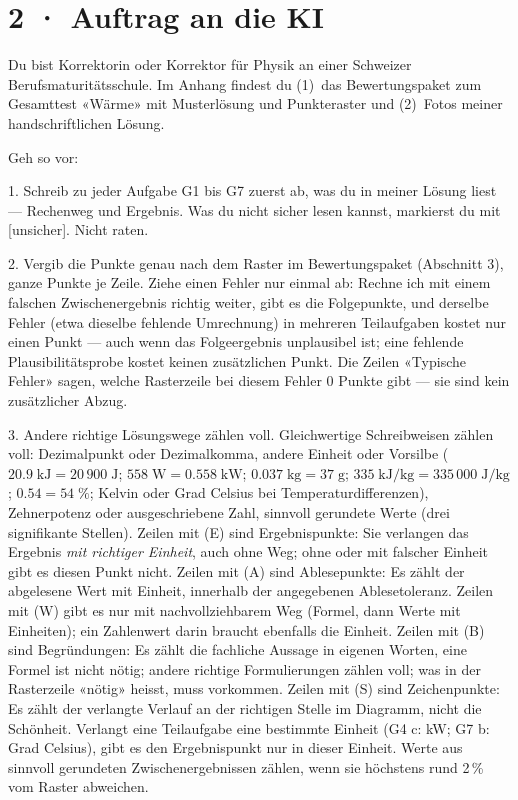 \documentclass[11pt]{article}
\begin{document}
\section*{2 · Auftrag an die KI}
\begin{tcolorbox}[breakable,colback=lplinie!25,colframe=lplinie,boxrule=0.5pt,arc=1mm,fontupper=\small]
Du bist Korrektorin oder Korrektor für Physik an einer Schweizer Berufsmaturitätsschule. Im Anhang findest du (1)~das Bewertungspaket zum Gesamttest «Wärme» mit Musterlösung und Punkteraster und (2)~Fotos meiner handschriftlichen Lösung.\par\medskip
Geh so vor:\par
1. Schreib zu jeder Aufgabe G1 bis G7 zuerst ab, was du in meiner Lösung liest — Rechenweg und Ergebnis. Was du nicht sicher lesen kannst, markierst du mit [unsicher]. Nicht raten.\par
2. Vergib die Punkte genau nach dem Raster im Bewertungspaket (Abschnitt 3), ganze Punkte je Zeile. Ziehe einen Fehler nur einmal ab: Rechne ich mit einem falschen Zwischenergebnis richtig weiter, gibt es die Folgepunkte, und derselbe Fehler (etwa dieselbe fehlende Umrechnung) in mehreren Teilaufgaben kostet nur einen Punkt — auch wenn das Folgeergebnis unplausibel ist; eine fehlende Plausibilitätsprobe kostet keinen zusätzlichen Punkt. Die Zeilen «Typische Fehler» sagen, welche Rasterzeile bei diesem Fehler 0 Punkte gibt — sie sind kein zusätzlicher Abzug.\par
3. Andere richtige Lösungswege zählen voll. Gleichwertige Schreibweisen zählen voll: Dezimalpunkt oder Dezimalkomma, andere Einheit oder Vorsilbe ($20.9\;\text{kJ} = 20\,900\;\text{J}$; $558\;\text{W} = 0.558\;\text{kW}$; $0.037\;\text{kg} = 37\;\text{g}$; $335\;\text{kJ/kg} = 335\,000\;\text{J/kg}$; $0.54 = 54\;\%$; Kelvin oder Grad Celsius bei Temperaturdifferenzen), Zehnerpotenz oder ausgeschriebene Zahl, sinnvoll gerundete Werte (drei signifikante Stellen). Zeilen mit (E) sind Ergebnispunkte: Sie verlangen das Ergebnis \emph{mit richtiger Einheit}, auch ohne Weg; ohne oder mit falscher Einheit gibt es diesen Punkt nicht. Zeilen mit (A) sind Ablesepunkte: Es zählt der abgelesene Wert mit Einheit, innerhalb der angegebenen Ablesetoleranz. Zeilen mit (W) gibt es nur mit nachvollziehbarem Weg (Formel, dann Werte mit Einheiten); ein Zahlenwert darin braucht ebenfalls die Einheit. Zeilen mit (B) sind Begründungen: Es zählt die fachliche Aussage in eigenen Worten, eine Formel ist nicht nötig; andere richtige Formulierungen zählen voll; was in der Rasterzeile «nötig» heisst, muss vorkommen. Zeilen mit (S) sind Zeichenpunkte: Es zählt der verlangte Verlauf an der richtigen Stelle im Diagramm, nicht die Schönheit. Verlangt eine Teilaufgabe eine bestimmte Einheit (G4 c: kW; G7 b: Grad Celsius), gibt es den Ergebnispunkt nur in dieser Einheit. Werte aus sinnvoll gerundeten Zwischenergebnissen zählen, wenn sie höchstens rund 2\,\% vom Raster abweichen.\par

\end{tcolorbox}
\end{document}
